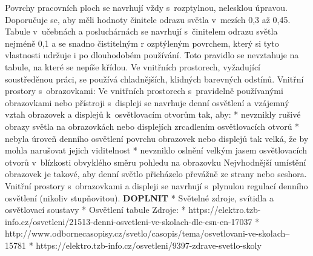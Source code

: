 Povrchy pracovních ploch se navrhují vždy s~rozptylnou, nelesklou úpravou. Doporučuje se, aby měli hodnoty
činitele odrazu světla v~mezích 0,3 až 0,45.
\medskip
Tabule v~učebnách a posluchárnách se navrhují s~činitelem odrazu světla nejméně 0,1 a se snadno čistitelným r
ozptýleným povrchem, který si tyto vlastnosti udržuje i po dlouhodobém používání.
Toto pravidlo se nevztahuje na tabule, na které se nepíše křídou.
\medskip
Ve vnitřních prostorech, vyžadující soustředěnou práci, se používá chladnějších, klidných barevných odstínů.
\medskip
Vnitřní prostory s~obrazovkami:
\medskip
Ve vnitřních prostorech s~pravidelně používanými obrazovkami nebo přístroji s~displeji se navrhuje denní
osvětlení a vzájemný vztah obrazovek a displejů k~osvětlovacím otvorům tak, aby:
\medskip
\begitems
    * nevznikly rušivé obrazy světla na obrazovkách nebo displejích zrcadlením osvětlovacích otvorů
    * nebyla úroveň denního osvětlení povrchu obrazovek nebo displejů tak velká, že by mohla narušovat jejich viditelnost
    * nevzniklo oslnění velkým jasem osvětlovacích otvorů v~blízkosti obvyklého směru pohledu na obrazovku
\enditems
\medskip
Nejvhodnější umístění obrazovek je takové, aby denní světlo přicházelo převážně ze strany nebo seshora.
\medskip
Vnitřní prostory s~obrazovkami a displeji se navrhují s~plynulou regulací denního osvětlení (nikoliv stupňovitou).
\medskip
{\bf DOPLNIT}
\begitems
* Světelné zdroje, svítidla a osvětlovací soustavy
* Osvětlení tabule
\enditems
\medskip
{\sbf Zdroje:}
\begitems
* https://elektro.tzb-info.cz/osvetleni/21513-denni-osvetleni-ve-skolach-dle-csn-en-17037
* http://www.odbornecasopisy.cz/svetlo/casopis/tema/osvetlovani-ve-skolach--15781
* https://elektro.tzb-info.cz/osvetleni/9397-zdrave-svetlo-skoly
\enditems





